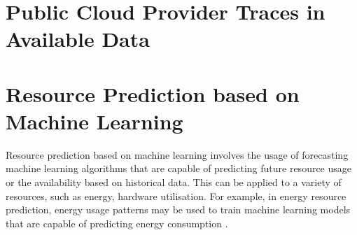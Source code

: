 






    \section{Public Cloud Provider Traces in Available Data}
    \label{sec:public-cloud-provider-traces-in-available-data-related-work}
    
    \section{Resource Prediction based on Machine Learning}
    \label{sec:resource-prediction-based-on-machine-learning-related-work}
    
        Resource prediction based on machine learning involves the usage of forecasting machine learning algorithms that are capable of predicting future resource usage or the availability based on historical data.
        This can be applied to a variety of resources, such as energy, hardware utilisation.
        For example, in energy resource prediction, energy usage patterns may be used to train machine learning models that are capable of predicting energy consumption \cite{shapiEnergyConsumptionPrediction2021} \cite{richDeepMindAIReduces2016}.

